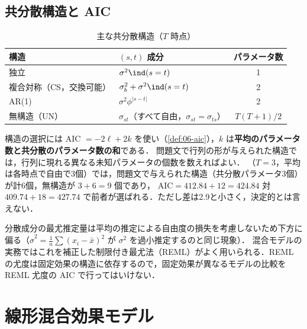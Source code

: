\subsection{共分散構造と AIC}\label{subsec:08-cov}
\begin{table}[htbp]
\centering\small
\caption{主な共分散構造（$T$ 時点）}\label{tab:08-cov}
\begin{tabular}{@{}lL{62mm}c@{}}
\toprule
構造 & $(s,t)$ 成分 & パラメータ数\\
\midrule
独立 & $\sigma^2\ind(s=t)$ & 1\\
複合対称（CS，交換可能） & $\sigma_b^2+\sigma^2\ind(s=t)$ & 2\\
AR(1) & $\sigma^2\phi^{|s-t|}$ & 2\\
無構造（UN） & $\sigma_{st}$（すべて自由，$\sigma_{st}=\sigma_{ts}$） & $T(T+1)/2$\\
\bottomrule
\end{tabular}
\end{table}
\Hinshutsu 構造の選択には AIC $=-2\ell+2k$ を使い（\cref{def:06-aic}），$k$ は\textbf{平均のパラメータ数と共分散のパラメータ数の和}である．
問題文で行列の形が与えられた構造では，行列に現れる異なる未知パラメータの個数を数えればよい．
（$T=3$，平均は各時点で自由で3個）では，問題文で与えられた構造（共分散パラメータ3個）が計6個，無構造が $3+6=9$ 個であり，
$\mathrm{AIC}=412.84+12=424.84$ 対 $409.74+18=427.74$ で前者が選ばれる．ただし差は2.9と小さく，決定的とは言えない．
\begin{supbox}[補足：REML]
分散成分の最尤推定量は平均の推定による自由度の損失を考慮しないため下方に偏る（$\hat\sigma^2=\frac1n\sum(x_i-\bar x)^2$ が $\sigma^2$ を過小推定するのと同じ現象）．
混合モデルの実務ではこれを補正した制限付き最尤法（REML）がよく用いられる．REML の尤度は固定効果の構造に依存するので，固定効果が異なるモデルの比較を REML 尤度の AIC で行ってはいけない．
\end{supbox}

\section{線形混合効果モデル}\label{sec:08-lmm}
